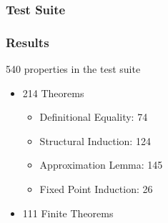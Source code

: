 \documentclass[serif,professionalfont]{beamer}
\begin{document}

\begin{frame}[fragile]
\frametitle{Test Suite}
\begin{table}[p]
\centering
%
\end{table}
\end{frame}



\begin{frame}
\frametitle{Results}
\label{sec-5}

540 properties in the test suite

\begin{itemize}
\item 214 Theorems
      \begin{itemize}
      \item Definitional Equality: 74
      \item Structural Induction:  124
      \item Approximation Lemma:   145
      \item Fixed Point Induction: 26
      \end{itemize}
\item 111 Finite Theorems
\end{itemize}

\end{frame}
\end{document}
